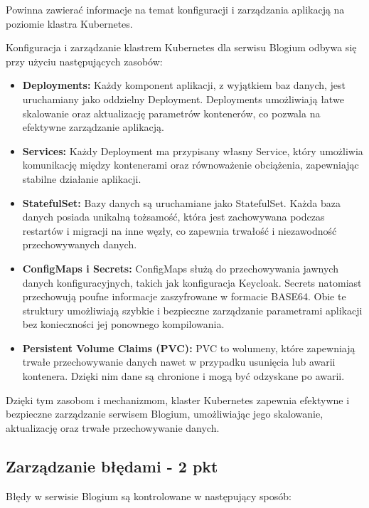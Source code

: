 \documentclass[12pt,a4paper]{article}
\begin{document}
Powinna zawierać informacje na temat konfiguracji i zarządzania aplikacją na poziomie klastra Kubernetes.

Konfiguracja i zarządzanie klastrem Kubernetes dla serwisu Blogium odbywa się przy użyciu następujących zasobów:

\begin{itemize}
  \item \textbf{Deployments:} Każdy komponent aplikacji, z wyjątkiem baz danych, jest uruchamiany jako oddzielny Deployment. Deployments umożliwiają łatwe skalowanie oraz aktualizację parametrów kontenerów, co pozwala na efektywne zarządzanie aplikacją.
  
  \item \textbf{Services:} Każdy Deployment ma przypisany własny Service, który umożliwia komunikację między kontenerami oraz równoważenie obciążenia, zapewniając stabilne działanie aplikacji.
  
  \item \textbf{StatefulSet:} Bazy danych są uruchamiane jako StatefulSet. Każda baza danych posiada unikalną tożsamość, która jest zachowywana podczas restartów i migracji na inne węzły, co zapewnia trwałość i niezawodność przechowywanych danych.
  
  \item \textbf{ConfigMaps i Secrets:} ConfigMaps służą do przechowywania jawnych danych konfiguracyjnych, takich jak konfiguracja Keycloak. Secrets natomiast przechowują poufne informacje zaszyfrowane w formacie BASE64. Obie te struktury umożliwiają szybkie i bezpieczne zarządzanie parametrami aplikacji bez konieczności jej ponownego kompilowania.
  
  \item \textbf{Persistent Volume Claims (PVC):} PVC to wolumeny, które zapewniają trwałe przechowywanie danych nawet w przypadku usunięcia lub awarii kontenera. Dzięki nim dane są chronione i mogą być odzyskane po awarii.
\end{itemize}

Dzięki tym zasobom i mechanizmom, klaster Kubernetes zapewnia efektywne i bezpieczne zarządzanie serwisem Blogium, umożliwiając jego skalowanie, aktualizację oraz trwałe przechowywanie danych.


\subsection{Zarządzanie błędami - 2 pkt}
\label{sec:ERD} 

Błędy w serwisie Blogium są kontrolowane w następujący sposób:
\end{document}
